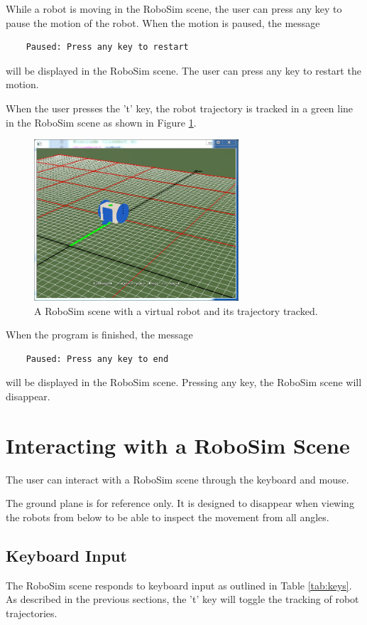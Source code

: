 \documentclass{article}
\begin{document}
While a robot is moving in the RoboSim scene, the user can press any key to
pause the motion of the robot.  When the motion is paused, the message
\begin{verbatim}
    Paused: Press any key to restart
\end{verbatim}
will be displayed in the RoboSim scene. The user can press any key to restart
the motion.

When the user presses the 't' key, the robot trajectory is tracked in a green
line in the RoboSim scene as shown in Figure \ref{fig:robosim_tracked}.
\begin{figure}[H]
	\begin{center}
		\includegraphics[width=3in]{images/robosim_tracked}
	\end{center}
	\caption{A RoboSim scene with a virtual robot and its trajectory tracked.}
	\label{fig:robosim_tracked}
\end{figure}

When the program is finished, the message
\begin{verbatim}
    Paused: Press any key to end
\end{verbatim}
will be displayed in the RoboSim scene.  Pressing any key, the RoboSim scene
will disappear.

\section{Interacting with a RoboSim Scene}
The user can interact with a RoboSim scene through the keyboard and mouse.

The ground plane is for reference only.  It is designed to disappear when
viewing the robots from below to be able to inspect the movement from all
angles.

\subsection{Keyboard Input}
The RoboSim scene responds to keyboard input as outlined in Table
\ref{tab:keys}.  As described in the previous sections, 
the 't' key will toggle the tracking of robot trajectories.
\end{document}
